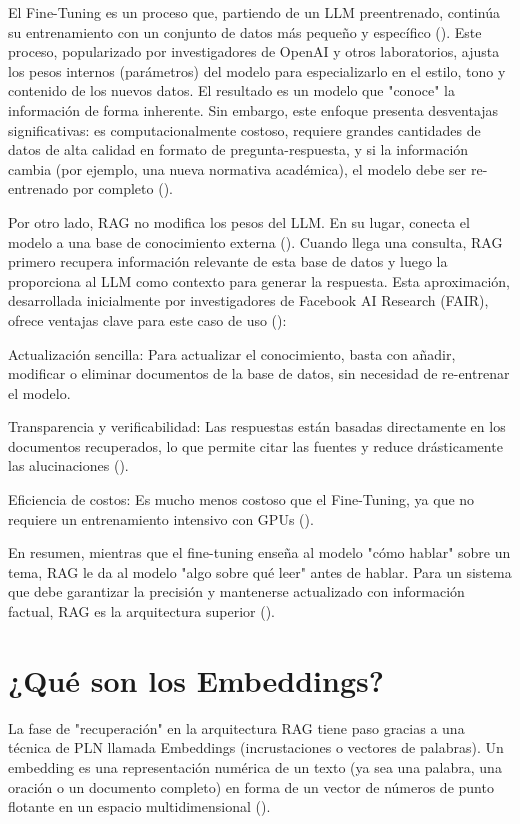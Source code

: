 {{El Fine-Tuning es un proceso que, partiendo de un LLM preentrenado, continúa su entrenamiento con un conjunto de datos más pequeño y específico (\cite{radford2018improving}). Este proceso, popularizado por investigadores de OpenAI y otros laboratorios, ajusta los pesos internos (parámetros) del modelo para especializarlo en el estilo, tono y contenido de los nuevos datos. El resultado es un modelo que "conoce" la información de forma inherente. Sin embargo, este enfoque presenta desventajas significativas: es computacionalmente costoso, requiere grandes cantidades de datos de alta calidad en formato de pregunta-respuesta, y si la información cambia (por ejemplo, una nueva normativa académica), el modelo debe ser re-entrenado por completo (\cite{databricks2023rag}).

Por otro lado, RAG no modifica los pesos del LLM. En su lugar, conecta el modelo a una base de conocimiento externa (\cite{lewis2020retrieval}). Cuando llega una consulta, RAG primero recupera información relevante de esta base de datos y luego la proporciona al LLM como contexto para generar la respuesta. Esta aproximación, desarrollada inicialmente por investigadores de Facebook AI Research (FAIR), ofrece ventajas clave para este caso de uso (\cite{lewis2020retrieval}):

\begin{listaenumerada}
    \item Actualización sencilla: Para actualizar el conocimiento, basta con añadir, modificar o eliminar documentos de la base de datos, sin necesidad de re-entrenar el modelo.
    \item Transparencia y verificabilidad: Las respuestas están basadas directamente en los documentos recuperados, lo que permite citar las fuentes y reduce drásticamente las alucinaciones (\cite{lewis2020retrieval}).
    \item Eficiencia de costos: Es mucho menos costoso que el Fine-Tuning, ya que no requiere un entrenamiento intensivo con GPUs  (\cite{pinecone2023ragft}).

\end{listaenumerada}

En resumen, mientras que el fine-tuning enseña al modelo "cómo hablar" sobre un tema, RAG le da al modelo "algo sobre qué leer" antes de hablar. Para un sistema que debe garantizar la precisión y mantenerse actualizado con información factual, RAG es la arquitectura superior (\cite{pinecone2023ragft}).

\section{¿Qué son los Embeddings? }
La fase de "recuperación" en la arquitectura RAG tiene paso gracias a una técnica de PLN llamada Embeddings (incrustaciones o vectores de palabras). Un embedding es una representación numérica de un texto (ya sea una palabra, una oración o un documento completo) en forma de un vector de números de punto flotante en un espacio multidimensional (\cite{tensorflow2023}).

}}
